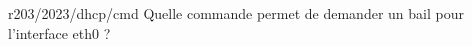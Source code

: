 \begin{question}{r203/2023/dhcp/cmd}
  Quelle commande permet de demander un bail pour l'interface eth0 ?
  \begin{reponses}
    \lastchoices
  \end{reponses}
\end{question}
